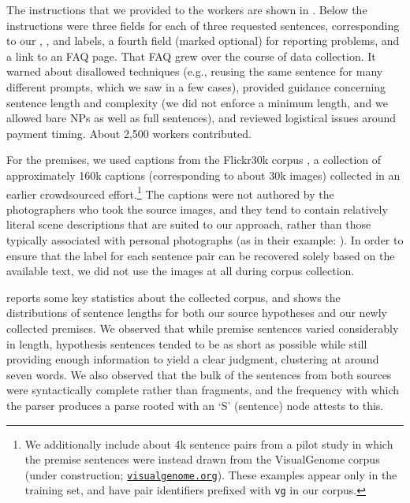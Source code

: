 The instructions that we provided to the workers are shown in . Below the instructions were three fields for each of three requested sentences, corresponding to our , , and  labels, a fourth field (marked optional) for reporting problems, and a link to an FAQ page. That FAQ grew over the course of data collection. It warned about disallowed techniques (e.g., reusing the same sentence for many different prompts, which we saw in a few cases), provided guidance concerning sentence length and complexity (we did not enforce a minimum length, and we allowed bare NPs as well as full sentences), and reviewed logistical issues around payment timing. About 2,500 workers contributed.

For the premises, we used captions from the Flickr30k corpus \cite{hodoshimage}, a collection of approximately 160k captions (corresponding to about 30k images) collected in an earlier crowdsourced effort.\footnote{
We additionally include about 4k sentence pairs from a pilot study in which the premise sentences were instead drawn from the VisualGenome corpus (under construction; \texttt{\href{https://visualgenome.org/}{visualgenome.org}}). These examples appear only in the training set, and have pair identifiers prefixed with \texttt{vg} in our corpus.
 } %
The captions were not authored by the photographers who took the source images, and they tend to contain relatively literal scene descriptions that are suited to our approach, rather than those typically associated with personal photographs (as in their example: ). In order to ensure that the label for each sentence pair can be recovered solely based on the available text, we did not use the images at all during corpus collection.

 reports some key statistics about the collected corpus, and  shows the distributions of sentence lengths for both our source hypotheses and our newly collected premises. We observed that while premise sentences varied considerably in length, hypothesis sentences tended to be as short as possible while still providing enough information to yield a clear judgment, clustering at around seven words. We also observed that the bulk of the sentences from both sources were syntactically complete rather than fragments, and the frequency with which the parser produces a parse rooted with an `S' (sentence) node attests to this.

